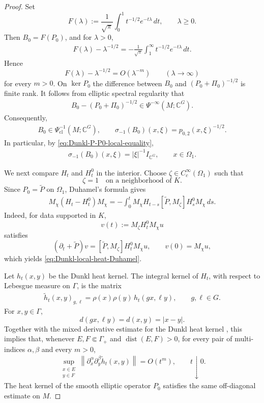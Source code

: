 \documentclass{amsart}
\begin{document}
\begin{proof}
Set
\[
F(\lambda)
:=
\frac1{\sqrt\pi}
\int_0^1 t^{-1/2}e^{-t\lambda}\,dt,
\qquad
\lambda\geq0.
\]
Then \(B_0=F(P_0)\), and for \(\lambda>0\),
\begin{align*}
F(\lambda)-\lambda^{-1/2}
=
-\frac1{\sqrt\pi}
\int_1^\infty
t^{-1/2}e^{-t\lambda}\,dt.
\end{align*}
Hence
\[
F(\lambda)-\lambda^{-1/2}
=
O(\lambda^{-m})
\qquad
(\lambda\to\infty)
\]
for every \(m>0\). On \(\ker P_0\) the difference between \(B_0\)
and \((P_0+\Pi_0)^{-1/2}\) is finite rank. It follows from elliptic
spectral regularity that
\begin{align*}
B_0-(P_0+\Pi_0)^{-1/2}
\in\Psi^{-\infty}(M;\mathbb C^G).
\end{align*}
Consequently,
\begin{align}
B_0\in\Psi_{\mathrm{cl}}^{-1}(M;\mathbb C^G),
\qquad
\sigma_{-1}(B_0)(x,\xi)
=
p_{0,2}(x,\xi)^{-1/2}.
\label{eq:Dunkl-B0-symbol}
\end{align}
In particular, by \eqref{eq:Dunkl-P-P0-local-equality},
\begin{align}
\sigma_{-1}(B_0)(x,\xi)
=
|\xi|^{-1}I_{\mathbb C^G},
\qquad
x\in\Omega_1.
\label{eq:Dunkl-B0-local-symbol}
\end{align}

We next compare \(H_t\) and \(H_t^0\) in the interior. Choose
\(\zeta\in C_c^\infty(\Omega_1)\) such that
\[
\zeta=1
\quad\text{on a neighborhood of }K.
\]
Since \(P_0=\widetilde P\) on \(\Omega_1\), Duhamel's formula gives
\begin{align}
M_\chi(H_t-H_t^0)M_\chi
=
-\int_0^t
M_\chi H_{t-s}
[\widetilde P,M_\zeta]
H_s^0M_\chi\,ds.
\label{eq:Dunkl-local-heat-Duhamel}
\end{align}
Indeed, for data supported in \(K\),
\[
v(t):=M_\zeta H_t^0M_\chi u
\]
satisfies
\[
(\partial_t+\widetilde P)v
=
[\widetilde P,M_\zeta]H_t^0M_\chi u,
\qquad
v(0)=M_\chi u,
\]
which yields \eqref{eq:Dunkl-local-heat-Duhamel}.

Let \(h_t(x,y)\) be the Dunkl heat kernel. The integral kernel of
\(H_t\), with respect to Lebesgue measure on \(\Gamma\), is the
matrix
\begin{align}
\widetilde h_t(x,y)_{g,\ell}
=
\rho(x)\rho(y)\,
h_t(gx,\ell y),
\qquad g,\ell\in G.
\label{eq:Dunkl-folded-heat-kernel}
\end{align}
For \(x,y\in\Gamma\),
\[
d(gx,\ell y)=d(x,y)=|x-y|.
\]
Together with the mixed derivative estimate for the Dunkl heat
kernel \cite[Theorem~3.1]{MR4042416}, this implies that, whenever
\(E,F\Subset\Gamma_+\) and
\(\operatorname{dist}(E,F)>0\), for every pair of multi-indices
\(\alpha,\beta\) and every \(m>0\),
\begin{align}
\sup_{\substack{x\in E\\y\in F}}
\left\|
\partial_x^\alpha
\partial_y^\beta
\widetilde h_t(x,y)
\right\|
=
O(t^m),
\qquad
t\downarrow0.
\label{eq:Dunkl-folded-heat-off-diagonal}
\end{align}
The heat kernel of the smooth elliptic operator \(P_0\) satisfies the
same off-diagonal estimate on \(M\).


\end{proof}
\end{document}
